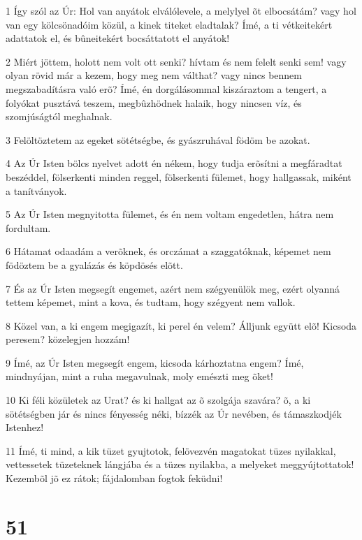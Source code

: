 \par 1 Így szól az Úr: Hol van anyátok elválólevele, a melylyel õt elbocsátám? vagy hol van egy kölcsönadóim közül, a kinek titeket eladtalak? Ímé, a ti vétkeitekért adattatok el, és bûneitekért bocsáttatott el anyátok!
\par 2 Miért jöttem, holott nem volt ott senki? hívtam és nem felelt senki sem! vagy olyan rövid már a kezem, hogy meg nem válthat? vagy nincs bennem megszabadításra való erõ? Ímé, én dorgálásommal kiszáraztom a tengert, a folyókat pusztává teszem, megbûzhödnek halaik, hogy nincsen víz, és szomjúságtól meghalnak.
\par 3 Felöltöztetem az egeket sötétségbe, és gyászruhával födöm be azokat.
\par 4 Az Úr Isten bölcs nyelvet adott én nékem, hogy tudja erõsítni a megfáradtat beszéddel, fölserkenti minden reggel, fölserkenti fülemet, hogy hallgassak, miként a tanítványok.
\par 5 Az Úr Isten megnyitotta fülemet, és én nem voltam engedetlen, hátra nem fordultam.
\par 6 Hátamat odaadám a verõknek, és orczámat a szaggatóknak, képemet nem födöztem be a gyalázás és köpdösés elõtt.
\par 7 És az Úr Isten megsegít engemet, azért nem szégyenülök meg, ezért olyanná tettem képemet, mint a kova, és tudtam, hogy szégyent nem vallok.
\par 8 Közel van, a ki engem megigazít, ki perel én velem? Álljunk együtt elõ! Kicsoda peresem? közelegjen hozzám!
\par 9 Ímé, az Úr Isten megsegít engem, kicsoda kárhoztatna engem? Ímé, mindnyájan, mint a ruha megavulnak, moly emészti meg õket!
\par 10 Ki féli közületek az Urat? és ki hallgat az õ szolgája szavára? õ, a ki sötétségben jár és nincs fényesség néki, bízzék az Úr nevében, és támaszkodjék Istenhez!
\par 11 Ímé, ti mind, a kik tüzet gyujtotok, felövezvén magatokat tüzes nyilakkal, vettessetek tüzeteknek lángjába és a tüzes nyilakba, a melyeket meggyújtottatok! Kezembõl jõ ez rátok; fájdalomban fogtok feküdni!

\chapter{51}

